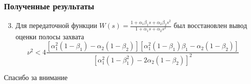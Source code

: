 \documentclass{beamer}
\begin{document}
\begin{frame}
\frametitle{Полученные результаты}
\begin{enumerate}
\setcounter{enumi}{2}
\item Для передаточной функции $W(s) = \frac{1+\alpha_1\beta_1s + \alpha_2\beta_2s^2}{1+\alpha_1s + \alpha_2s^2}$ был восстановлен вывод оценки полосы захвата
 \begin{equation*}
\nu^2 < 4\frac{[\alpha_1^2(1-\beta_1) - \alpha_2(1-\beta_2)][\alpha_1^2(1-\beta_1)\beta_1 - \alpha_2(1-\beta_2)]}{[\alpha_1^2(1-\beta_1^2) - 2\alpha_2(1-\beta_2)]^2}
 \end{equation*}
\end{enumerate}
\end{frame}


\begin{frame}
\Huge{\centerline{Спасибо за внимание}}
\end{frame}

\end{document}
